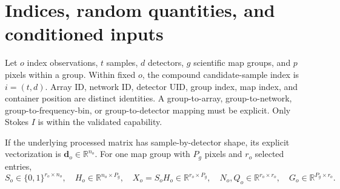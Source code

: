 \documentclass[11pt]{article}
\begin{document}
\section{Indices, random quantities, and conditioned inputs}

Let \(o\) index observations, \(t\) samples, \(d\) detectors, \(g\) scientific
map groups, and \(p\) pixels within a group. Within fixed \(o\), the compound
candidate-sample index is \(i=(t,d)\). Array ID, network ID, detector UID, group index, map index,
and container position are distinct identities. A group-to-array,
group-to-network, group-to-frequency-bin, or group-to-detector mapping must be
explicit. Only Stokes \(I\) is within the validated capability.

If the underlying processed matrix has sample-by-detector shape, its explicit
vectorization is \(\boldsymbol d_o\in\mathbb R^{n_o}\). For one map group with
\(P_g\) pixels and \(r_o\) selected entries,
\begin{equation*}
 S_o\in\{0,1\}^{r_o\times n_o},\quad
 H_o\in\mathbb R^{n_o\times P_g},\quad
 X_o=S_oH_o\in\mathbb R^{r_o\times P_g},\quad
 N_o,Q_o\in\mathbb R^{r_o\times r_o},\quad
 G_o\in\mathbb R^{P_g\times r_o}.
\end{equation*}
\end{document}
